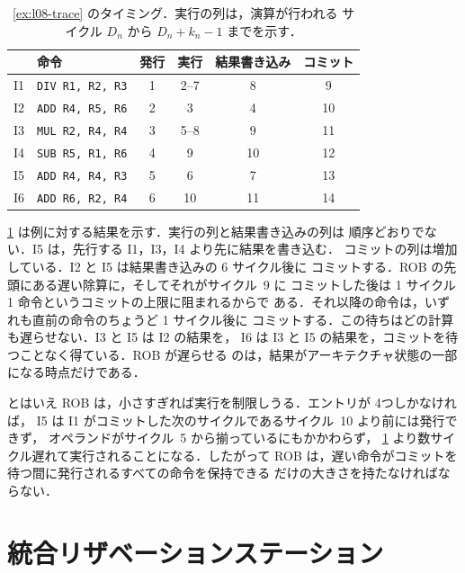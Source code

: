 \documentclass[../main.tex]{subfiles}
\begin{document}
\begin{table}[htbp]
  \centering\small
  \caption{\cref{ex:l08-trace} のタイミング．実行の列は，演算が行われる
    サイクル $D_n$ から $D_n+k_n-1$ までを示す．}
  \label{tab:l08-timing}
  \begin{tabular}{@{}llcccc@{}}
    \toprule
    & 命令 & 発行 & 実行 & 結果書き込み & コミット \\
    \midrule
    I1 & \texttt{DIV R1, R2, R3} & 1 & 2--7 & 8  & 9  \\
    I2 & \texttt{ADD R4, R5, R6} & 2 & 3    & 4  & 10 \\
    I3 & \texttt{MUL R2, R4, R4} & 3 & 5--8 & 9  & 11 \\
    I4 & \texttt{SUB R5, R1, R6} & 4 & 9    & 10 & 12 \\
    I5 & \texttt{ADD R4, R4, R3} & 5 & 6    & 7  & 13 \\
    I6 & \texttt{ADD R6, R2, R4} & 6 & 10   & 11 & 14 \\
    \bottomrule
  \end{tabular}
\end{table}

\cref{tab:l08-timing} は例に対する結果を示す．実行の列と結果書き込みの列は
順序どおりでない．I5 は，先行する I1，I3，I4 より先に結果を書き込む．
コミットの列は増加している．I2 と I5 は結果書き込みの 6 サイクル後に
コミットする．ROB の先頭にある遅い除算に，そしてそれがサイクル~9 に
コミットした後は 1 サイクル 1 命令というコミットの上限に阻まれるからで
ある．それ以降の命令は，いずれも直前の命令のちょうど 1 サイクル後に
コミットする．この待ちはどの計算も遅らせない．I3 と I5 は I2 の結果を，
I6 は I3 と I5 の結果を，コミットを待つことなく得ている．ROB が遅らせる
のは，結果がアーキテクチャ状態の一部になる時点だけである．%

とはいえ ROB は，小さすぎれば実行を制限しうる．エントリが 4つしかなければ，
I5 は I1 がコミットした次のサイクルであるサイクル~10 より前には発行できず，
オペランドがサイクル~5 から揃っているにもかかわらず，
\cref{tab:l08-timing} より数サイクル遅れて実行されることになる．したがって
ROB は，遅い命令がコミットを待つ間に発行されるすべての命令を保持できる
だけの大きさを持たなければならない．

\section{統合リザベーションステーション}
\label{sec:l08-unified}
\end{document}
